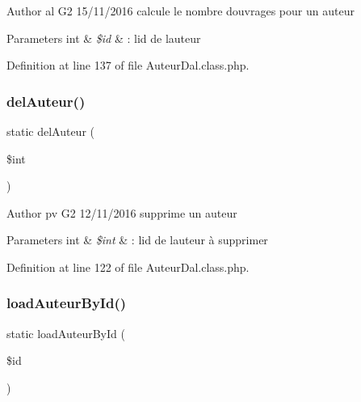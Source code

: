 \begin{DoxyAuthor}{Author}
al G2 15/11/2016 calcule le nombre d\textquotesingle{}ouvrages pour un auteur 
\end{DoxyAuthor}

\begin{DoxyParams}[1]{Parameters}
int & {\em \$id} & \+: l\textquotesingle{}id de l\textquotesingle{}auteur \\
\hline
\end{DoxyParams}


Definition at line 137 of file Auteur\+Dal.\+class.\+php.

\mbox{\label{class_auteur_dal_a6d3d3c3b786607d460707f5ceaf74adb}} 
\subsubsection{\texorpdfstring{del\+Auteur()}{delAuteur()}}
{\footnotesize\ttfamily static del\+Auteur (\begin{DoxyParamCaption}\item[{}]{\$int }\end{DoxyParamCaption})\hspace{0.3cm}{\ttfamily [static]}}

\begin{DoxyAuthor}{Author}
pv G2 12/11/2016 supprime un auteur 
\end{DoxyAuthor}

\begin{DoxyParams}[1]{Parameters}
int & {\em \$int} & \+: l\textquotesingle{}id de l\textquotesingle{}auteur à supprimer \\
\hline
\end{DoxyParams}


Definition at line 122 of file Auteur\+Dal.\+class.\+php.

\mbox{\label{class_auteur_dal_a666c9a00825829e8b8ad711b0fce62fc}} 
\subsubsection{\texorpdfstring{load\+Auteur\+By\+Id()}{loadAuteurById()}}
{\footnotesize\ttfamily static load\+Auteur\+By\+Id (\begin{DoxyParamCaption}\item[{}]{\$id }\end{DoxyParamCaption})\hspace{0.3cm}{\ttfamily [static]}}

